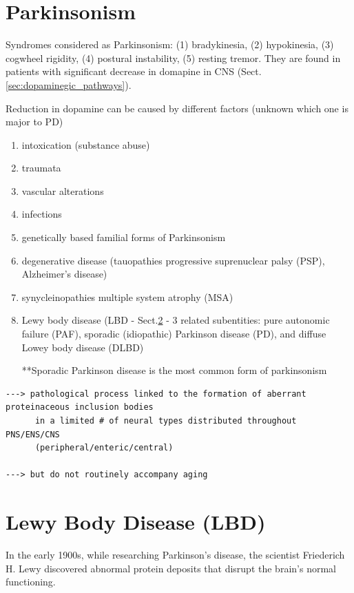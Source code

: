 \section{Parkinsonism}
\label{sec:Parkinsonism}

Syndromes considered as Parkinsonism: (1) bradykinesia, (2) hypokinesia, (3)
cogwheel rigidity, (4) postural instability, (5) resting tremor.
They are found in patients with significant decrease in domapine in CNS
(Sect.\ref{sec:dopaminegic_pathways}).

Reduction in dopamine can be caused by different factors (unknown which one is
major to PD)
\begin{enumerate}
  \item  intoxication (substance abuse)
  \item   traumata
  \item   vascular alterations
  \item   infections
  \item   genetically based familial forms of Parkinsonism
  \item   degenerative disease (tauopathies progressive suprenuclear palsy (PSP), Alzheimer's disease)
  \item   synycleinopathies multiple system atrophy (MSA)

  \item   Lewy body disease (LBD - Sect.\ref{sec:lewy-body-disease} - 3 related
  subentities: pure autonomic failure (PAF), sporadic (idiopathic) Parkinson
  disease (PD), and diffuse Lowey body disease (DLBD)

**Sporadic Parkinson disease is the most common form of parkinsonism
 
\end{enumerate}
{\small
\begin{verbatim}
---> pathological process linked to the formation of aberrant proteinaceous inclusion bodies 
      in a limited # of neural types distributed throughout PNS/ENS/CNS
      (peripheral/enteric/central)

---> but do not routinely accompany aging
\end{verbatim}
}

\section{Lewy Body Disease (LBD)}
\label{sec:lewy-body-disease} 

In the early 1900s, while researching Parkinson's disease, the scientist
Friederich H. Lewy discovered abnormal protein deposits that disrupt the brain's
normal functioning.

